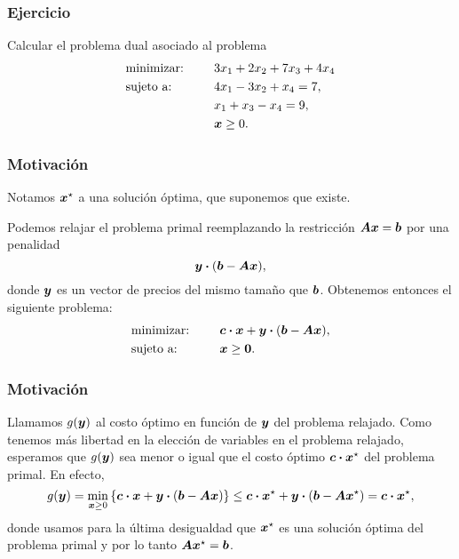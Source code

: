 \documentclass[aspectratio=169,12pt,spanish]{beamer}
\begin{document}

\begin{frame}
\frametitle{Ejercicio}

Calcular el problema dual asociado al problema
\begin{alignat*}{2}
  & \text{minimizar: } & & 3x_1 + 2x_2 + 7x_3 + 4x_4  \\
   & \text{sujeto a: } & \quad & 4x_1 - 3x_2 + x_4 = 7, \\
   &  & \quad & x_1 + x_3 - x_4 = 9, \\
   &&& \bm{x} \ge 0.
\end{alignat*}



\end{frame}


\begin{frame}
\frametitle{Motivación}

Notamos $\bm{x}^\star$ a una solución óptima, que suponemos que existe.

Podemos relajar el problema primal reemplazando la restricción $\bm{A}\bm{x} = \bm{b}$ por una penalidad
$$\bm{y} \boldsymbol{\cdot} (\bm{b} - \bm{A}\bm{x}),$$
donde $\bm{y}$ es un vector de precios del mismo tamaño que $\bm{b}$. Obtenemos entonces el siguiente problema:
\begin{alignat*}{2}
  & \text{minimizar: } & & \bm{c} \boldsymbol{\cdot} \bm{x} + \bm{y} \boldsymbol{\cdot} (\bm{b} - \bm{A}\bm{x}), \\
   & \text{sujeto a: } & \quad & \bm{x} \ge \bm{0}.
\end{alignat*}



\end{frame}


\begin{frame}
\frametitle{Motivación}

Llamamos $g(\bm{y})$ al costo óptimo en función de $\bm{y}$ del problema relajado. Como tenemos más libertad en la elección de variables en el problema relajado, esperamos que $g(\bm{y})$ sea menor o igual que el costo óptimo $\bm{c} \boldsymbol{\cdot} \bm{x}^\star$ del problema primal. En efecto,
$$
g(\bm{y}) = \min_{\bm{x} \ge 0} \left\{ \bm{c} \boldsymbol{\cdot} \bm{x} + \bm{y} \boldsymbol{\cdot} (\bm{b}-\bm{A}\bm{x})\right\} \le \bm{c} \boldsymbol{\cdot} \bm{x}^\star + \bm{y} \boldsymbol{\cdot} (\bm{b} - \bm{A}\bm{x}^\star) = \bm{c} \boldsymbol{\cdot} \bm{x}^\star,
$$
donde usamos para la última desigualdad que $\bm{x}^\star$ es una solución óptima del problema primal y por lo tanto $\bm{A}\bm{x}^\star = \bm{b}$.

\end{frame}
\end{document}
